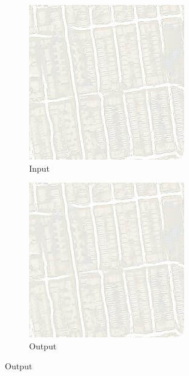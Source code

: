\begin{figure}[ht]
  \begin{subfigure}[t]{.14\textwidth}
    \centering
    \caption*{Input}
    \includegraphics[width=\linewidth]{images/cycleGanResults/Maps19Ld120_E100_Lr0002.jpg}
  \end{subfigure}
  \begin{subfigure}[t]{.14\textwidth}
    \centering
    \caption*{Output}
    \includegraphics[width=\linewidth]{images/cycleGanResults/Maps19Ld120_E100_Lr0002.jpg}

\end{subfigure}
\end{figure}
